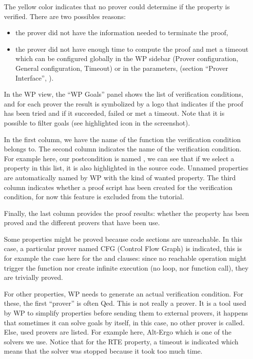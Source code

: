 The yellow color indicates that no prover could determine if the
property is verified. There are two possibles reasons:
\begin{itemize}
\item the prover did not have the information needed to terminate the proof,
\item the prover did not have enough time to compute the proof and met a timeout
      which can be configured globally in the WP sidebar (Prover configuration,
      General configuration, Timeout) or in the parameters, (section
      ``Prover Interface'', ).
\end{itemize}


In the WP view, the ``WP Goals'' panel shows the list of verification
conditions, and for each prover the result is symbolized by a logo that
indicates if the proof has been tried and if it succeeded, failed or met a
timeout. Note that it is possible to filter goals (see highlighted icon in the
screenshot).




In the first column, we have the name of the function the verification
condition belongs to. The second column indicates the name of the verification
condition. For example here, our postcondition is named
, we can see
that if we select a property in this list, it is also highlighted in the
source code. Unnamed properties are automatically named by WP with the
kind of wanted property. The third column indicates whether a proof script has
been created for the verification condition, for now this feature is excluded
from the tutorial.


Finally, the last column provides the proof results: whether the property has
been proved and the different provers that have been use.

Some properties might be proved because code sections are unreachable. In this
case, a particular prover named CFG (Control Flow Graph) is indicated, this is
for example the case here for the  and 
clauses: since no reachable operation might trigger the 
function nor create infinite execution (no loop, nor function call), they are
trivially proved.

For other properties, WP needs to generate an actual verification condition. For
these, the first ``prover'' is often Qed. This is not really a prover. It is a
tool used by WP to simplify properties before sending them to external provers,
it happens that sometimes it can solve goals by itself, in this case, no other
prover is called. Else, used provers are listed. For example here, Alt-Ergo
which is one of the solvers we use. Notice that for the RTE property, a timeout
is indicated which means that the  solver was stopped because it took too much
time.


